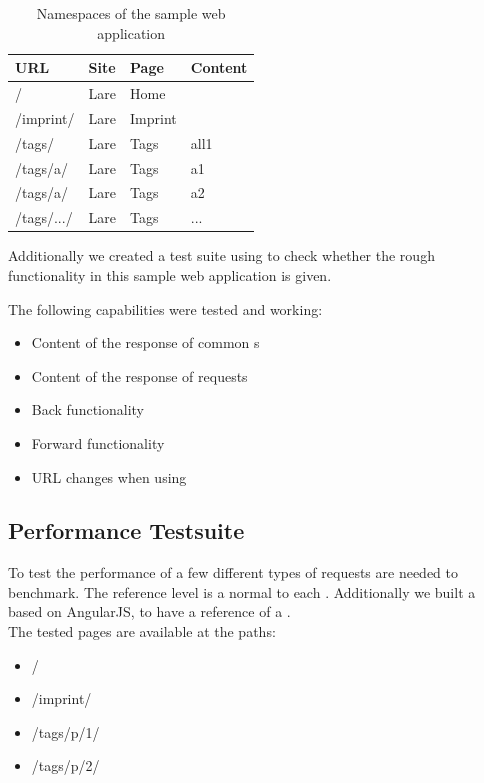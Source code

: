 \begin{table}[h]
\centering
\caption{Namespaces of the sample web application}
\begin{tabular}{llll}
	\hline
	\textbf{URL} & \textbf{Site} & \textbf{Page} & \textbf{Content} \\
	\hline
	/ & Lare & Home &  \\
	/imprint/ & Lare & Imprint &  \\
	/tags/ & Lare & Tags & all1 \\
	/tags/a/ & Lare & Tags & a1 \\
	/tags/a/ & Lare & Tags & a2 \\
	/tags/.../ & Lare & Tags & ... \\
	\hline
\end{tabular}
\label{tab:sampleapp_namespaces}
\end{table}

Additionally we created a test suite using \selenium{} to check whether the rough functionality in this sample web application is given.

The following capabilities were tested and working:
\begin{itemize}
\item Content of the response of common \httpRequest{}s
\item Content of the response of \lare{} requests
\item Back functionality
\item Forward functionality
\item URL changes when using \lare{}
\end{itemize}


\subsection{Performance Testsuite\label{sec:eva_testsuite}}

To test the performance of \lare{} a few different types of requests are needed to benchmark.
The reference level is a normal \httpRequest{} to each \webPage{}.
Additionally we built a \webApplication{} based on AngularJS, to have a reference of a \clientSideMVC{}.
\\
The tested pages are available at the paths:

\begin{itemize}
\item /
\item /imprint/
\item /tags/p/1/
\item /tags/p/2/
\end{itemize}

